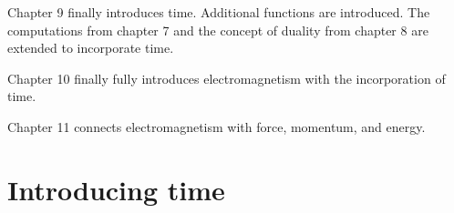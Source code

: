 \documentclass{book}
\begin{document}
Chapter 9 finally introduces time. Additional functions are introduced. The computations from chapter 7 and the concept of duality from chapter 8 are extended to incorporate time.

Chapter 10 finally fully introduces electromagnetism with the incorporation of time.  

Chapter 11 connects electromagnetism with force, momentum, and energy. 


\tableofcontents




\mainmatter







































\chapter{Introducing time}
\end{document}
